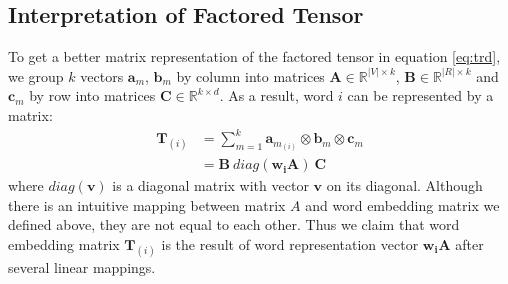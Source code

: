 \documentclass[a4paper]{article}
\begin{document}
\subsection{Interpretation of Factored Tensor} \label{sec:tf-expl}
To get a better matrix representation of the factored tensor in equation \eqref{eq:trd}, we group $k$ vectors $\mathbf{a}_m$, $\mathbf{b}_m$ by column into matrices $\mathbf{A} \in \mathbb{R}^{|V| \times k}$, $\mathbf{B} \in \mathbb{R}^{|R| \times k}$ and $\mathbf{c}_m$ by row into matrices $\mathbf{C} \in \mathbb{R}^{k \times d}$. As a result, word $i$ can be represented by a matrix: 
\begin{equation} \label{eq:we-tensor}
\begin{aligned}
    \mathbf{T}_{(i)}
        &= \sum_{m=1}^{k} \mathbf{a}_{m_{(i)}} \otimes \mathbf{b}_{m} \otimes \mathbf{c}_m \\
        &= \mathbf{B} \ diag(\mathbf{w_i}\mathbf{A}) \ \mathbf{C}
\end{aligned}
\end{equation}
where $diag(\mathbf{v})$ is a diagonal matrix with vector $\mathbf{v}$ on its diagonal. Although there is an intuitive mapping between matrix $A$ and word embedding matrix we defined above, they are not equal to each other. Thus we claim that word embedding matrix $\mathbf{T}_{(i)}$ is the result of word representation vector $\mathbf{w_i}\mathbf{A}$ after several linear mappings. 
\end{document}
